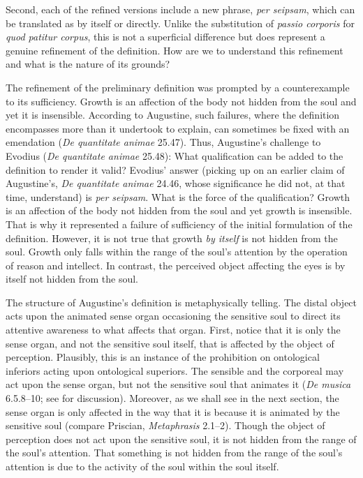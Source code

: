 \documentclass[12pt]{article}
\begin{document}
Second, each of the refined versions include a new phrase, \emph{per seipsam}, which can be translated as by itself or directly. Unlike the substitution of \emph{passio corporis} for \emph{quod patitur corpus}, this is not a superficial difference but does represent a genuine refinement of the definition. How are we to understand this refinement and what is the nature of its grounds?

The refinement of the preliminary definition was prompted by a counterexample to its sufficiency. Growth is an affection of the body not hidden from the soul and yet it is insensible. According to Augustine, such failures, where the definition encompasses more than it undertook to explain, can sometimes be fixed with an emendation (\emph{De quantitate animae} 25.47). Thus, Augustine's challenge to Evodius (\emph{De quantitate animae} 25.48): What qualification can be added to the definition to render it valid? Evodius' answer (picking up on an earlier claim of Augustine's, \emph{De quantitate animae} 24.46, whose significance he did not, at that time, understand) is \emph{per seipsam}. What is the force of the qualification? Growth is an affection of the body not hidden from the soul and yet growth is insensible. That is why it represented a failure of sufficiency of the initial formulation of the definition. However, it is not true that growth \emph{by itself} is not hidden from the soul. Growth only falls within the range of the soul's attention by the operation of reason and intellect. In contrast, the perceived object affecting the eyes is by itself not hidden from the soul.

The structure of Augustine's definition is metaphysically telling. The distal object acts upon the animated sense organ occasioning the sensitive soul to direct its attentive awareness to what affects that organ. First, notice that it is only the sense organ, and not the sensitive soul itself, that is affected by the object of perception. Plausibly, this is an instance of the prohibition on ontological inferiors acting upon ontological superiors. The sensible and the corporeal may act upon the sense organ, but not the sensitive soul that animates it (\emph{De musica} 6.5.8–10; see \citealt{Silva:2014bh} for discussion). Moreover, as we shall see in the next section, the sense organ is only affected in the way that it is because it is animated by the sensitive soul (compare Priscian, \emph{Metaphrasis} 2.1--2). Though the object of perception does not act upon the sensitive soul, it is not hidden from the range of the soul's attention. That something is not hidden from the range of the soul’s attention is due to the activity of the soul within the soul itself.
\end{document}
